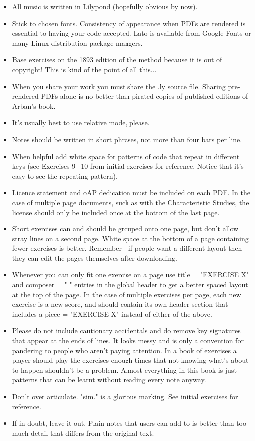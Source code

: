 \documentclass[12pt,a4paper]{article}
\begin{document}
\begin{itemize}
\item All music is written in Lilypond (hopefully obvious by now).
\item Stick to chosen fonts. Consistency of appearance when PDFs are rendered is essential to having your code accepted. Lato is available from Google Fonts or many Linux distribution package mangers.
\item Base exercises on the 1893 edition of the method because it is out of copyright! This is kind of the point of all this...
\item When you share your work you must share the .ly source file. Sharing pre-rendered PDFs alone is no better than pirated copies of published editions of Arban's book.
\item It's usually best to use relative mode, please.
\item Notes should be written in short phrases, not more than four bars per line.
\item When helpful add white space for patterns of code that repeat in different keys (see Exercises 9+10 from initial exercises for reference. Notice that it's easy to see the repeating pattern).
\item Licence statement and oAP dedication must be included on each PDF. In the case of multiple page documents, such as with the Characteristic Studies, the license should only be included once at the bottom of the last page.
\item Short exercises can and should be grouped onto one page, but don't allow stray lines on a second page. White space at the bottom of a page containing fewer exercises is better. Remember - if people want a different layout then they can edit the pages themselves after downloading.
\item Whenever you can only fit one exercise on a page use title = "EXERCISE X" and composer = " " entries in the global header to get a better spaced layout at the top of the page. In the case of multiple exercises per page, each new exercise is a new score, and should contain its own header section that includes a piece = "EXERCISE X" instead of either of the above.
\item Please do not include cautionary accidentals and do remove key signatures that appear at the ends of lines. It looks messy and is only a convention for pandering to people who aren't paying attention. In a book of exercises a player should play the exercises enough times that not knowing what's about to happen shouldn't be a problem. Almost everything in this book is just patterns that can be learnt without reading every note anyway.
\item Don't over articulate. "sim." is a glorious marking. See initial exercises for reference.
\item If in doubt, leave it out. Plain notes that users can add to is better than too much detail that differs from the original text.
\end{itemize}
\end{document}
